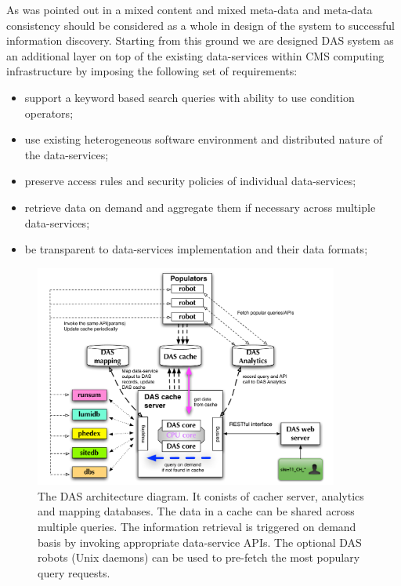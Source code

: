 \documentclass[1p,times]{elsarticle}
\begin{document}
As was pointed out in \cite{Arms} a mixed content and 
mixed meta-data and meta-data consistency should be considered as a whole in design 
of the system to successful information discovery. 
Starting from this ground we are designed DAS system as an
additional layer on top of the existing data-services
within CMS computing infrastructure by imposing the following set of requirements:
\begin{itemize}
\item support a keyword based search queries with ability to use condition operators;
\item use existing heterogeneous software environment and distributed nature of the data-services;
\item preserve access rules and security policies of individual data-services;
\item retrieve data on demand and aggregate them if necessary across
multiple data-services;
\item be transparent to data-services implementation and their data formats;
\end{itemize}
\begin{figure}[htb]
\centering
\includegraphics[width=100mm]{DAS_Cache_and_Analytics.pdf}
\caption{
The DAS architecture diagram. It conists of cacher server,
analytics and mapping databases. The data in a cache can be shared
across multiple queries. The information retrieval is triggered
on demand basis by invoking appropriate data-service APIs. The
optional DAS robots (Unix daemons) can be used to pre-fetch
the most populary query requests.
}
\label{DAS_cache}
\end{figure}
\end{document}
